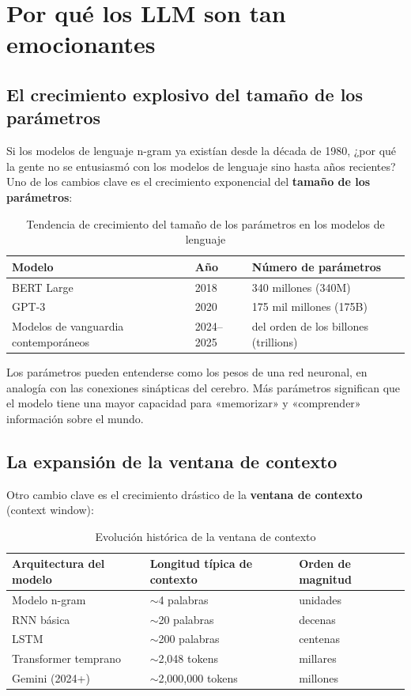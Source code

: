 \section{Por qué los LLM son tan emocionantes}

\subsection{El crecimiento explosivo del tamaño de los parámetros}

Si los modelos de lenguaje n-gram ya existían desde la década de 1980, ¿por qué la gente no se entusiasmó con los modelos de lenguaje sino hasta años recientes? Uno de los cambios clave es el crecimiento exponencial del \textbf{tamaño de los parámetros}:

\begin{table}[H]
\centering
\begin{tabular}{lll}
\toprule
\textbf{Modelo} & \textbf{Año} & \textbf{Número de parámetros} \\
\midrule
BERT Large     & 2018 & 340 millones (340M)  \\
GPT-3          & 2020 & 175 mil millones (175B) \\
Modelos de vanguardia contemporáneos   & 2024--2025 & del orden de los billones (trillions) \\
\bottomrule
\end{tabular}
\caption{Tendencia de crecimiento del tamaño de los parámetros en los modelos de lenguaje}
\end{table}

Los parámetros pueden entenderse como los pesos de una red neuronal, en analogía con las conexiones sinápticas del cerebro. Más parámetros significan que el modelo tiene una mayor capacidad para «memorizar» y «comprender» información sobre el mundo.

\subsection{La expansión de la ventana de contexto}

Otro cambio clave es el crecimiento drástico de la \textbf{ventana de contexto} (context window):

\begin{table}[H]
\centering
\begin{tabular}{lll}
\toprule
\textbf{Arquitectura del modelo} & \textbf{Longitud típica de contexto} & \textbf{Orden de magnitud} \\
\midrule
Modelo n-gram       & $\sim$4 palabras          & unidades \\
RNN básica           & $\sim$20 palabras         & decenas \\
LSTM               & $\sim$200 palabras        & centenas \\
Transformer temprano   & $\sim$2,048 tokens    & millares \\
Gemini (2024+)    & $\sim$2,000,000 tokens & millones \\
\bottomrule
\end{tabular}
\caption{Evolución histórica de la ventana de contexto}
\end{table}

